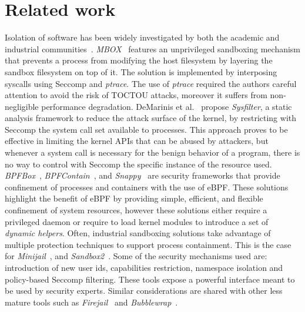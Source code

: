 \section{Related work}
\label{natisand:rel_works}

Isolation of software has been widely investigated by both the academic
and industrial communities~\cite{berman1995tron, kim2013practical,
  demarinis2020sysfilter, minijail, sandbox2, firejail,
  bubblewrap,seapp,wasi-poster}.  {\em MBOX}~\cite{
  kim2013practical} features an unprivileged sandboxing mechanism that
prevents a process from modifying the host filesystem by layering the
sandbox filesystem on top of it. The solution is implemented by
interposing syscalls using Seccomp and {\em ptrace}. The use of {\em
  ptrace} required the authors careful attention to avoid the risk of
TOCTOU attacks, moreover it suffers from non-negligible performance
degradation. DeMarinis et al.~\cite{demarinis2020sysfilter} propose
{\em Sysfilter}, a static analysis framework to reduce the attack
surface of the kernel, by restricting with Seccomp the system call set
available to processes.  This approach proves to be effective in
limiting the kernel APIs that can be abused by attackers, but whenever
a system call is necessary for the benign behavior of a program, there
is no way to control with Seccomp the specific instance of the
resource used. {\em BPFBox}~\cite{ findlay2020bpfbox}, {\em
  BPFContain}~\cite{findlay2021bpfcontain}, and {\em
  Snappy}~\cite{belair2021snappy} are security frameworks that provide
confinement of processes and containers with the use of eBPF.  These
solutions highlight the benefit of eBPF by providing simple, efficient,
and flexible confinement of system resources, however these solutions
either require a privileged daemon or require to load kernel modules
to introduce a set of {\em dynamic helpers}.   Often,
industrial sandboxing solutions take advantage of multiple protection
techniques to support process containment. This is the case for {\em
  Minijail}~\cite{minijail}, and {\em Sandbox2}~\cite{ sandbox2}. Some
of the security mechanisms used are: introduction of new user ids,
capabilities restriction, namespace isolation and policy-based Seccomp
filtering. These tools expose a powerful interface meant
to be used by security experts. Similar considerations are shared with
other less mature tools such as {\em Firejail}~\cite{ firejail} and
{\em Bubblewrap}~\cite{bubblewrap}.

